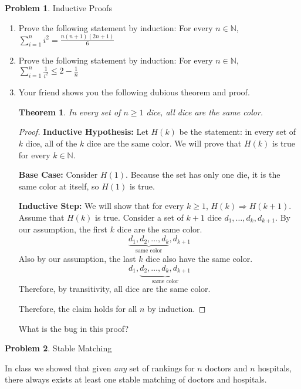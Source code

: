 \documentclass[11pt]{article}
\newcommand{\N}{\mathbb{N}}
\newtheorem{thm}{Theorem}
\theoremstyle{definition}
\theoremstyle{theorem}
\newtheorem{prob}{Problem}
\newcommand{\solution}{\medskip\noindent{\color{DarkBlue}\textbf{Solution:}}}
\begin{document}
\begin{prob} Inductive Proofs \end{prob}
\begin{enumerate}[label=(\alph*)]
\item Prove the following statement by induction: For every $n \in \N$, $\sum_{i=1}^{n} i^2 = \frac{n(n+1)(2n+1)}{6}$

\solution

\item Prove the following statement by induction: For every $n \in \N$, $\sum_{i=1}^{n} \frac{1}{i^2} \leq 2 - \frac{1}{n}$

\solution

\item Your friend shows you the following dubious theorem and proof.

\begin{thm} In every set of $n \geq 1$ dice, all dice are the same color.   \end{thm}
\begin{proof}

\textbf{Inductive Hypothesis:} Let $H(k)$ be the statement: in every set of $k$ dice, all of the $k$ dice are the same color.  We will prove that $H(k)$ is true for every $k \in \N$.

\noindent \textbf{Base Case:} Consider $H(1)$.  Because the set has only one die, it is the same color at itself, so $H(1)$ is true.

\noindent \textbf{Inductive Step:}  We will show that for every $k \geq 1$, $H(k) \Longrightarrow H(k+1)$. Assume that $H(k)$ is true.  Consider a set of $k+1$ dice $d_1, \ldots, d_k, d_{k+1}$. By our assumption, the first $k$ dice are the same color.
$$\underbrace{d_1, d_2, \ldots, d_k}_\text{same color}, d_{k+1}$$
Also by our assumption, the last $k$ dice also have the same color.
$$d_1,\underbrace{d_2, \ldots, d_k, d_{k+1}}_\text{same color}$$
Therefore, by transitivity, all dice are the same color.

Therefore, the claim holds for all $n$ by induction.
\end{proof}

What is the bug in this proof?

\solution

\end{enumerate}

\newpage
\begin{prob} Stable Matching \end{prob}
In class we showed that given \emph{any} set of rankings for $n$ doctors and $n$ hospitals, there always exists at least one stable matching of doctors and hospitals.  
\end{document}
